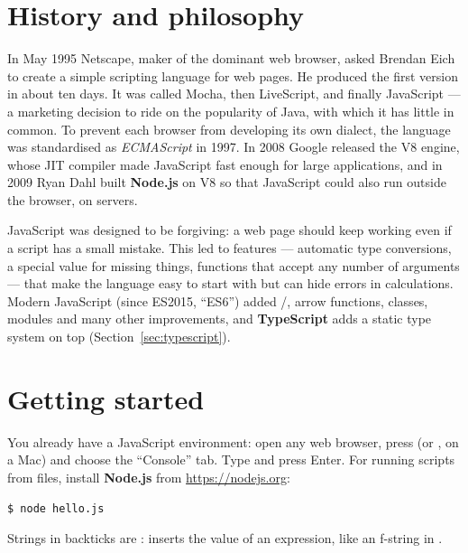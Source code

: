 \section{History and philosophy}

\begin{history}
In May 1995 Netscape, maker of the dominant web browser, asked Brendan Eich to create a
simple scripting language for web pages. He produced the first version in about ten days.
It was called Mocha, then LiveScript, and finally JavaScript --- a marketing decision to
ride on the popularity of Java, with which it has little in common. To prevent each
browser from developing its own dialect, the language was standardised as
\emph{ECMAScript} in 1997. In 2008 Google released the V8 engine, whose JIT compiler made
JavaScript fast enough for large applications, and in 2009 Ryan Dahl built
\textbf{Node.js} on V8 so that JavaScript could also run outside the browser, on servers.
\end{history}

JavaScript was designed to be forgiving: a web page should keep working even if a script
has a small mistake. This led to features --- automatic type conversions, a special value
 for missing things, functions that accept any number of arguments --- that
make the language easy to start with but can hide errors in calculations. Modern
JavaScript (since ES2015, ``ES6'') added /, arrow functions, classes,
modules and many other improvements, and \textbf{TypeScript} adds a static type system on
top (Section~\ref{sec:typescript}).

\section{Getting started}

You already have a JavaScript environment: open any web browser, press  (or
,  on a Mac) and choose the ``Console'' tab. Type
 and press Enter. For running scripts from files, install
\textbf{Node.js} from \url{https://nodejs.org}:
\begin{lstlisting}[style=shell]
$ node hello.js
\end{lstlisting}
Strings in backticks are : \code{\$\{\ldots\}} inserts the value of
an expression, like an f-string in \py.

